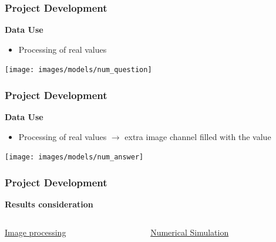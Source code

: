 \documentclass[18pt]{beamer}
\begin{document}
\begin{frame}[t]
  \frametitle{Project Development}
  \large{\textbf{Data Use}}
  \begin{itemize}
    \item Processing of real values
  \end{itemize}
  \vspace{0.5cm}
  \begin{center}
    \texttt{[image: images/models/num\_question]}
  \end{center}  
\end{frame}

\begin{frame}[t]
  \frametitle{Project Development}
  \large{\textbf{Data Use}}
  \begin{itemize}
    \item Processing of real values $\rightarrow$ extra image channel filled with the value
  \end{itemize}
  \vspace{0.5cm}
  \begin{center}
    \texttt{[image: images/models/num\_answer]}
  \end{center}  
\end{frame}

\begin{frame}[t]
  \frametitle{Project Development}
  \large{\textbf{Results consideration}}
  \vspace{-0.5cm}
  \begin{columns}[t]
    \begin{column}{0.5\textwidth}
      \begin{center}
        {\large \underline{Image processing}}
      \end{center}
    \end{column}
    \begin{column}{0.5\textwidth}
      \begin{center}
        {\large \underline{Numerical Simulation}}
      \end{center}  
    \end{column}
  \end{columns}  
\end{frame}
\end{document}
